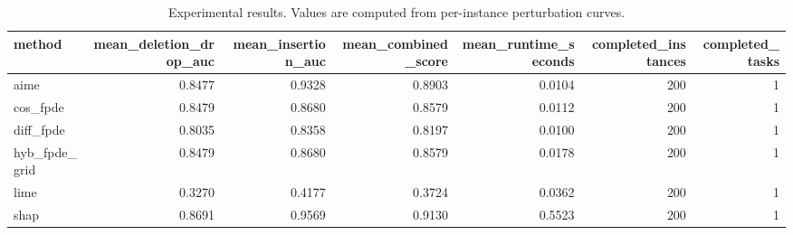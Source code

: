 \begin{table}[t]
\caption{Experimental results. Values are computed from per-instance perturbation curves.}
\label{tab:main_results_computed}
\centering
\begin{tabular}{lrrrrrr}
\toprule
method & mean\_deletion\_drop\_auc & mean\_insertion\_auc & mean\_combined\_score & mean\_runtime\_seconds & completed\_instances & completed\_tasks \\
\midrule
aime & 0.8477 & 0.9328 & 0.8903 & 0.0104 & 200 & 1 \\
cos\_fpde & 0.8479 & 0.8680 & 0.8579 & 0.0112 & 200 & 1 \\
diff\_fpde & 0.8035 & 0.8358 & 0.8197 & 0.0100 & 200 & 1 \\
hyb\_fpde\_grid & 0.8479 & 0.8680 & 0.8579 & 0.0178 & 200 & 1 \\
lime & 0.3270 & 0.4177 & 0.3724 & 0.0362 & 200 & 1 \\
shap & 0.8691 & 0.9569 & 0.9130 & 0.5523 & 200 & 1 \\
\bottomrule
\end{tabular}

\end{table}

